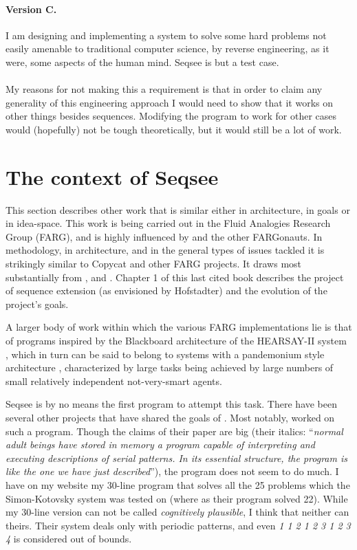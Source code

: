 \documentclass[letterpaper]{article}
\begin{document}
\paragraph{Version C.}  I am designing and implementing a system to solve some hard problems not easily amenable to traditional computer science, by reverse engineering, as it were, some aspects of the human mind.  Seqsee is but a test case.

\paragraph{} My reasons for not making this a requirement is that in order to claim any generality of this engineering approach I would need to show that it works on other things besides sequences.  Modifying the program to work for other cases would (hopefully) not be tough theoretically, but it would still be a lot of work.

\tableofcontents

\section{The context of Seqsee}
\label{sec:context}

This section describes other work that is similar either in architecture, in goals or in idea-space. This work is being carried out in the Fluid Analogies Research Group (FARG), and is highly influenced by \hof and the other FARGonauts. In methodology, in architecture, and in the general types of issues tackled it is strikingly similar to Copycat and other FARG projects. It draws most substantially from ,  and . Chapter 1 of this last cited book describes the project of sequence extension (as envisioned by Hofstadter) and the evolution of the project's goals.

A larger body of work within which the various FARG implementations lie is that of programs inspired by the Blackboard architecture of the HEARSAY-II system \cite{Reddy}, which in turn can be said to belong to systems with a pandemonium style architecture \cite{Dennett:Consciousness}, characterized by large tasks being achieved by large numbers of small relatively independent not-very-smart agents. 

Seqsee is by no means the first program to attempt this task. There have been several other projects that have shared the  goals of \seq. Most notably,  worked on such a program. Though the claims of their paper are big (their italics: ``\emph{normal adult beings have stored in memory a program capable of interpreting and executing descriptions of serial patterns. In its essential structure, the program is like the one we have just described}''), the program does not seem to do much. I have on my website \cite{Mahabal:simon} my 30-line program that solves all the 25 problems which the Simon-Kotovsky system was tested on (where as their program solved 22). While my 30-line version can not be called \emph{cognitively plausible}, I think that neither can theirs. Their system deals only with periodic patterns, and even \emph{1 1 2 1 2 3 1 2 3 4} is considered out of bounds.
\end{document}
